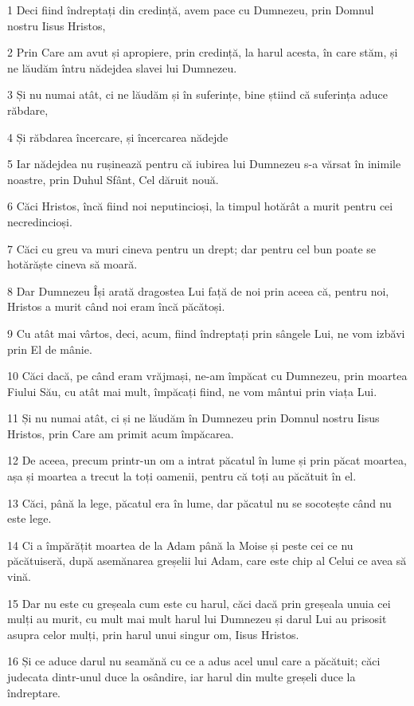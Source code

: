 \par 1 Deci fiind îndreptați din credință, avem pace cu Dumnezeu, prin Domnul nostru Iisus Hristos,
\par 2 Prin Care am avut și apropiere, prin credință, la harul acesta, în care stăm, și ne lăudăm întru nădejdea slavei lui Dumnezeu.
\par 3 Și nu numai atât, ci ne lăudăm și în suferințe, bine știind că suferința aduce răbdare,
\par 4 Și răbdarea încercare, și încercarea nădejde
\par 5 Iar nădejdea nu rușinează pentru că iubirea lui Dumnezeu s-a vărsat în inimile noastre, prin Duhul Sfânt, Cel dăruit nouă.
\par 6 Căci Hristos, încă fiind noi neputincioși, la timpul hotărât a murit pentru cei necredincioși.
\par 7 Căci cu greu va muri cineva pentru un drept; dar pentru cel bun poate se hotărăște cineva să moară.
\par 8 Dar Dumnezeu Își arată dragostea Lui față de noi prin aceea că, pentru noi, Hristos a murit când noi eram încă păcătoși.
\par 9 Cu atât mai vârtos, deci, acum, fiind îndreptați prin sângele Lui, ne vom izbăvi prin El de mânie.
\par 10 Căci dacă, pe când eram vrăjmași, ne-am împăcat cu Dumnezeu, prin moartea Fiului Său, cu atât mai mult, împăcați fiind, ne vom mântui prin viața Lui.
\par 11 Și nu numai atât, ci și ne lăudăm în Dumnezeu prin Domnul nostru Iisus Hristos, prin Care am primit acum împăcarea.
\par 12 De aceea, precum printr-un om a intrat păcatul în lume și prin păcat moartea, așa și moartea a trecut la toți oamenii, pentru că toți au păcătuit în el.
\par 13 Căci, până la lege, păcatul era în lume, dar păcatul nu se socotește când nu este lege.
\par 14 Ci a împărățit moartea de la Adam până la Moise și peste cei ce nu păcătuiseră, după asemănarea greșelii lui Adam, care este chip al Celui ce avea să vină.
\par 15 Dar nu este cu greșeala cum este cu harul, căci dacă prin greșeala unuia cei mulți au murit, cu mult mai mult harul lui Dumnezeu și darul Lui au prisosit asupra celor mulți, prin harul unui singur om, Iisus Hristos.
\par 16 Și ce aduce darul nu seamănă cu ce a adus acel unul care a păcătuit; căci judecata dintr-unul duce la osândire, iar harul din multe greșeli duce la îndreptare.
